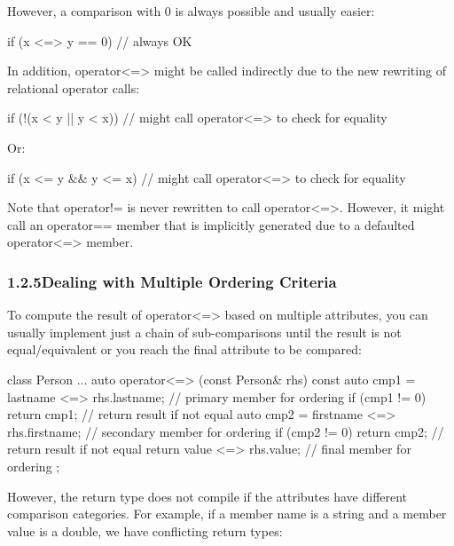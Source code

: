 However, a comparison with 0 is always possible and usually easier:

\begin{cpp}
if (x <=> y == 0) // always OK
\end{cpp}

In addition, operator<=> might be called indirectly due to the new rewriting of relational operator calls:

\begin{cpp}
if (!(x < y || y < x)) // might call operator<=> to check for equality
\end{cpp}

Or:

\begin{cpp}
if (x <= y && y <= x) // might call operator<=> to check for equality
\end{cpp}

Note that operator!= is never rewritten to call operator<=>. However, it might call an operator== member that is implicitly generated due to a defaulted operator<=> member.

\subsubsection*{ 1.2.5\hspace{0.2cm}Dealing with Multiple Ordering Criteria}

To compute the result of operator<=> based on multiple attributes, you can usually implement just a chain of sub-comparisons until the result is not equal/equivalent or you reach the final attribute to be compared:

\begin{cpp}
class Person {
	...
	auto operator<=> (const Person& rhs) const {
		auto cmp1 = lastname <=> rhs.lastname; // primary member for ordering
		if (cmp1 != 0) return cmp1; // return result if not equal
		auto cmp2 = firstname <=> rhs.firstname; // secondary member for ordering
		if (cmp2 != 0) return cmp2; // return result if not equal
		return value <=> rhs.value; // final member for ordering
	}
};
\end{cpp}

However, the return type does not compile if the attributes have different comparison categories. For example, if a member name is a string and a member value is a double, we have conflicting return types:

